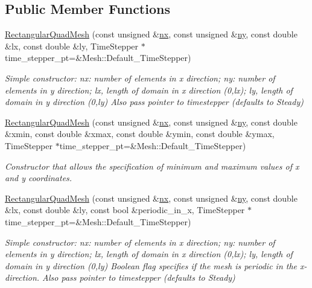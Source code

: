 \subsection*{Public Member Functions}
\begin{DoxyCompactItemize}
\item 
\hyperlink{classoomph_1_1RectangularQuadMesh_a1f906bca42da3d44765382013667e40d}{Rectangular\+Quad\+Mesh} (const unsigned \&\hyperlink{classoomph_1_1RectangularQuadMesh_abfef93d6322886cdce14a437186e4821}{nx}, const unsigned \&\hyperlink{classoomph_1_1RectangularQuadMesh_a86d76a55eb7c4e8bca9b74d23c8b0412}{ny}, const double \&lx, const double \&ly, Time\+Stepper $\ast$time\+\_\+stepper\+\_\+pt=\&Mesh\+::\+Default\+\_\+\+Time\+Stepper)
\begin{DoxyCompactList}\small\item\em Simple constructor\+: nx\+: number of elements in x direction; ny\+: number of elements in y direction; lx, length of domain in x direction (0,lx); ly, length of domain in y direction (0,ly) Also pass pointer to timestepper (defaults to Steady) \end{DoxyCompactList}\item 
\hyperlink{classoomph_1_1RectangularQuadMesh_aea506679674e4fc5c43b62a53798d0be}{Rectangular\+Quad\+Mesh} (const unsigned \&\hyperlink{classoomph_1_1RectangularQuadMesh_abfef93d6322886cdce14a437186e4821}{nx}, const unsigned \&\hyperlink{classoomph_1_1RectangularQuadMesh_a86d76a55eb7c4e8bca9b74d23c8b0412}{ny}, const double \&xmin, const double \&xmax, const double \&ymin, const double \&ymax, Time\+Stepper $\ast$time\+\_\+stepper\+\_\+pt=\&Mesh\+::\+Default\+\_\+\+Time\+Stepper)
\begin{DoxyCompactList}\small\item\em Constructor that allows the specification of minimum and maximum values of x and y coordinates. \end{DoxyCompactList}\item 
\hyperlink{classoomph_1_1RectangularQuadMesh_a40f120e00d682026e54593ca0f823535}{Rectangular\+Quad\+Mesh} (const unsigned \&\hyperlink{classoomph_1_1RectangularQuadMesh_abfef93d6322886cdce14a437186e4821}{nx}, const unsigned \&\hyperlink{classoomph_1_1RectangularQuadMesh_a86d76a55eb7c4e8bca9b74d23c8b0412}{ny}, const double \&lx, const double \&ly, const bool \&periodic\+\_\+in\+\_\+x, Time\+Stepper $\ast$time\+\_\+stepper\+\_\+pt=\&Mesh\+::\+Default\+\_\+\+Time\+Stepper)
\begin{DoxyCompactList}\small\item\em Simple constructor\+: nx\+: number of elements in x direction; ny\+: number of elements in y direction; lx, length of domain in x direction (0,lx); ly, length of domain in y direction (0,ly) Boolean flag specifies if the mesh is periodic in the x-\/direction. Also pass pointer to timestepper (defaults to Steady) \end{DoxyCompactList}\item 

\end{DoxyCompactItemize}
